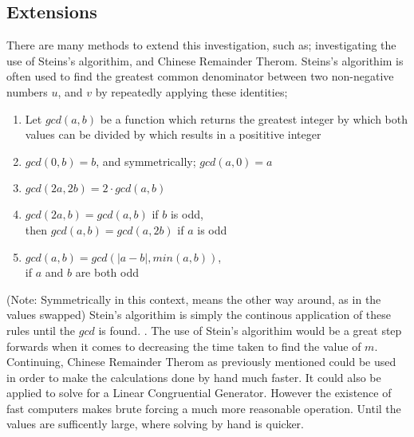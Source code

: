 \documentclass[12pft, english]{article}
\begin{document}
\begin{multicols}{2}
    \subsection{Extensions}
    There are many methods to extend this investigation, such as; investigating the use of Steins's algorithim, and Chinese Remainder Therom. Steins's algorithim is often used to find the greatest common denominator between two non-negative numbers \(u\), and \(v\) by repeatedly applying these identities;
    \begin{enumerate}
      \item Let \(gcd(a,b)\) be a function which returns the greatest integer by which both values can be divided by which results in a posititive integer
      \item \(gcd(0,b) = b\), and symmetrically; \(gcd(a,0) = a\)
      \item \(gcd(2a,2b) = 2 \cdot gcd(a,b)\)
      \item \(gcd(2a, b) = gcd(a,b)\) if \(b\) is odd,\\
            then \(gcd(a,b) = gcd(a,2b) \) if \(a\) is odd
      \item \(gcd(a,b) = gcd(|a-b|, min(a,b))\),\\
            if \(a\) and \(b\) are both odd
    \end{enumerate}
    (Note: Symmetrically in this context, means the other way around, as in the values swapped)
    Stein's algorithim is simply the continous application of these rules until the \(gcd\) is found. \citep{steinAlgo}. The use of Stein's algorithim would be a great step forwards when it comes to decreasing the time taken to find the value of \(m\). \\
    Continuing, Chinese Remainder Therom as previously mentioned could be used in order to make the calculations done by hand much faster. It could also be applied to solve for a Linear Congruential Generator. However the existence of fast computers makes brute forcing a much more reasonable operation. Until the values are sufficently large, where solving by hand is quicker. \citep{fallOntoPlanes}

\end{multicols}


\newpage



\end{document}
